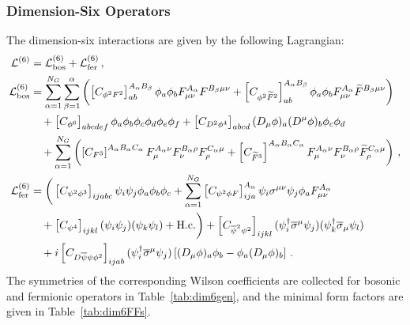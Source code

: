 

\subsubsection{Dimension-Six Operators}

The dimension-six interactions are given by the following Lagrangian:
\begin{align}\label{eq:L6}
    \mathcal{L}^{(6)} &= \mathcal{L}^{(6)}_{\text{bos}}+\mathcal{L}^{(6)}_{\text{fer}}\,,\\
    \mathcal{L}^{(6)}_{\text{bos}}&=\sum_{\alpha=1}^{N_G}\sum_{\beta=1}^\alpha \left(\left[C_{\phi^2 F^2}\right]^{A_\alpha B_\beta}_{ab}\phi_{a}\phi_{b}F^{A_\alpha}_{\mu\nu}F^{B_\beta  \mu\nu}+\left[C_{\phi^2 \widetilde{F}^2}\right]^{A_\alpha B_\beta}_{ab}\phi_{a}\phi_{b}F^{A_\alpha}_{\mu\nu}\widetilde{F}^{B_\beta  \mu\nu}\right)
    \nonumber\\&\quad  \nonumber
    + \left[C_{\phi^6}\right]_{abcdef}\phi_{a}\phi_{b}\phi_{c}\phi_{d}\phi_{e}\phi_{f}+\left[C_{D^2\phi^4}\right]_{abcd}(D_\mu \phi)_{a}(D^\mu \phi)_{b}\phi_{c}\phi_{d}\\&\quad
    +\sum_{\alpha=1}^{N_G}\left(\left[C_{F^3}\right]^{A_\alpha B_\alpha C_\alpha}F^{A_\alpha \nu}_{\mu}F^{B_\alpha \rho}_{ \nu} F^{C_\alpha \mu}_{\rho}+\left[C_{\widetilde F^3}\right]^{A_\alpha B_\alpha C_\alpha}F^{A_\alpha \nu}_{\mu}F^{B_\alpha\rho}_{ \nu} \widetilde F^{C_\alpha\mu}_{\rho}\right)\,,\\
    \mathcal{L}^{(6)}_{\text{fer}} &= \bigg(\left[C_{\psi^2\phi^3}\right]_{ijabc} \psi_i \psi_j \phi_a \phi_b \phi_c + \sum_{\alpha=1}^{N_G} \left[C_{\psi^2 \phi F}\right]_{ija}^{A_\alpha} \psi_i \sigma^{\mu\nu} \psi_j \phi_a F_{\mu\nu}^{A_\alpha}  \nonumber \\&\quad + \left[C_{\psi^4}\right]_{ijkl} (\psi_i \psi_j)(\psi_k\psi_l) + \text{H.c.}\bigg) + \left[C_{\overline \psi^2 \psi^2}\right]_{ijkl}(\psi_i^\dagger \overline \sigma^\mu \psi_j)(\psi_k^\dagger \overline \sigma_\mu \psi_l)\nonumber \\&\quad
    + i\left[C_{D\overline \psi \psi \phi^2}\right]_{ijab}(\psi^\dagger_i \overline \sigma^\mu \psi_j)\left[(D_\mu \phi)_a \phi_b - \phi_a (D_\mu \phi)_b\right]\,.
\end{align}
The symmetries of the corresponding Wilson coefficients are collected for bosonic and fermionic operators in Table~\ref{tab:dim6gen}, and the minimal form factors are given in Table~\ref{tab:dim6FFs}. 

